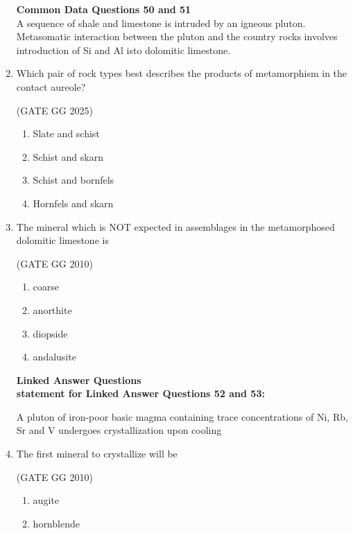 \documentclass[journal]{IEEEtran}
\begin{document}
\begin{enumerate}
\textbf{Common Data Questions 50 and 51}\\
A sequence of shale and limestone is intruded by an igneous pluton. Metasomatic interaction between the pluton and the country rocks involves introduction of Si and Al isto dolomitic limestone.

\item  Which pair of rock types best describes the products of metamorphism in the contact aureole?

\hfill(GATE GG 2025)
\begin{multicols}{2}
\begin{enumerate}

    \item Slate and schist
    \item Schist and skarn
\item Schist and bornfels
\item Hornfels and skarn
\end{enumerate}
\end{multicols}

\item The mineral which is NOT expected in assemblages in the metamorphosed dolomitic limestone is

\hfill (GATE GG 2010) 
\begin{multicols}{2}

\begin{enumerate}
    \item coarse
    \item  anorthite
\item diopside
\item andalusite
\end{enumerate}
\end{multicols}

\textbf{Linked Answer Questions}\\
\textbf{statement for Linked Answer Questions 52 and 53:}

A pluton of iron-poor basic magma containing trace concentrations of Ni, Rb, Sr and V undergoes crystallization upon cooling
\item The first mineral to crystallize will be

\hfill (GATE GG 2010) 
\begin{multicols}{4}

\begin{enumerate}
    \item augite

 \item hornblende


\end{enumerate}
\end{multicols}
\end{enumerate}
\end{document}
